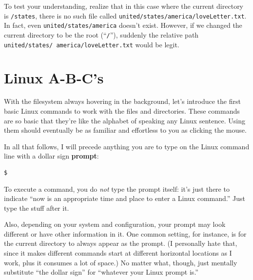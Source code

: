 To test your understanding, realize that in this case where the current
directory is \texttt{/states}, there is no such file called
\texttt{united/states/america/loveLetter.txt}. In fact, even 
\texttt{united/states/america} doesn't exist. However, if we changed the
current directory to be the root (``\texttt{/}''), suddenly the relative path
\texttt{united/states/ america/loveLetter.txt} would be legit.

\section{Linux A-B-C's}

With the filesystem always hovering in the background, let's introduce the
first basic Linux commands to work with the files and directories. These
commands are so basic that they're like the alphabet of speaking any Linux
sentence. Using them should eventually be as familiar and effortless to you as
clicking the mouse.

In all that follows, I will precede anything you are to type on the Linux
command line with a dollar sign \textbf{prompt}:

\begin{Verbatim}[fontsize=\small]
$
\end{Verbatim}

To execute a command, you do \textit{not} type the prompt itself: it's just
there to indicate ``now is an appropriate time and place to enter a Linux
command.'' Just type the stuff after it.

Also, depending on your system and configuration, your prompt may look
different or have other information in it. One common setting, for instance,
is for the current directory to always appear as the prompt. (I personally
hate that, since it makes different commands start at different horizontal
locations as I work, plus it consumes a lot of space.) No matter what, though,
just mentally substitute ``the dollar sign'' for ``whatever your Linux prompt
is.''

\newcommand{\bigline}{\begin{center} \line(1,0){300} \end{center}}


